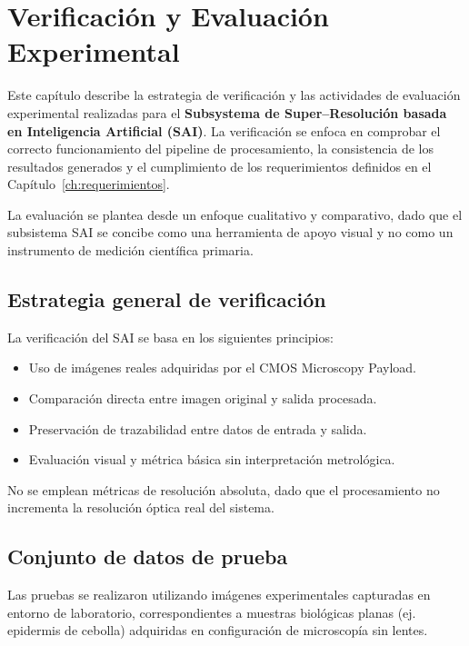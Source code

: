 \chapter{Verificación y Evaluación Experimental}
\label{ch:verificacion}

Este capítulo describe la estrategia de verificación y las actividades de
evaluación experimental realizadas para el \textbf{Subsystema de
Super--Resolución basada en Inteligencia Artificial (SAI)}. La verificación se
enfoca en comprobar el correcto funcionamiento del pipeline de procesamiento, la
consistencia de los resultados generados y el cumplimiento de los requerimientos
definidos en el Capítulo~\ref{ch:requerimientos}.

La evaluación se plantea desde un enfoque cualitativo y comparativo, dado que el
subsistema SAI se concibe como una herramienta de apoyo visual y no como un
instrumento de medición científica primaria.

\section{Estrategia general de verificación}

La verificación del SAI se basa en los siguientes principios:

\begin{itemize}
    \item Uso de imágenes reales adquiridas por el CMOS Microscopy Payload.
    \item Comparación directa entre imagen original y salida procesada.
    \item Preservación de trazabilidad entre datos de entrada y salida.
    \item Evaluación visual y métrica básica sin interpretación metrológica.
\end{itemize}

No se emplean métricas de resolución absoluta, dado que el procesamiento no
incrementa la resolución óptica real del sistema.

\section{Conjunto de datos de prueba}

Las pruebas se realizaron utilizando imágenes experimentales capturadas en
entorno de laboratorio, correspondientes a muestras biológicas planas
(ej. epidermis de cebolla) adquiridas en configuración de microscopía sin lentes.

